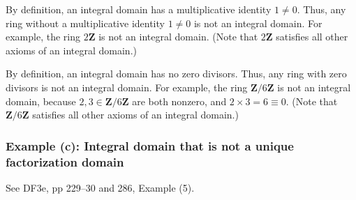 \documentclass[oneside, english, 11pt]{article}
\newcommand{\integers}{\mathbf{Z}}
\newcommand{\Z}{\integers}
\begin{document}
{By definition, an integral domain has a multiplicative identity $1 \neq 0$. Thus, any ring without a multiplicative identity $1 \neq 0$ is not an integral domain. For example, the ring $2 \Z$ is not an integral domain. (Note that $2 \Z$ satisfies all other axioms of an integral domain.)

By definition, an integral domain has no zero divisors. Thus, any ring with zero divisors is not an integral domain. For example, the ring $\Z / 6 \Z$ is not an integral domain, because $2, 3 \in \Z / 6 \Z$ are both nonzero, and $2 \times 3 = 6 \equiv 0$. (Note that $\Z / 6 \Z$ satisfies all other axioms of an integral domain.)



\subsubsection*{Example (c): Integral domain that is not a unique factorization domain}

See DF3e, pp 229--30 and 286, Example (5).

}
\end{document}
